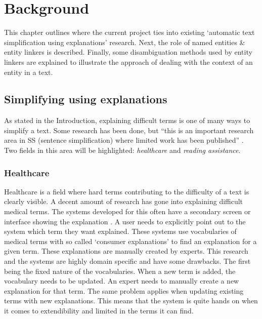 \documentclass[
10pt, %
a4paper, %
oneside, %
headinclude,footinclude, %
] {book}%
\begin{document}
\chapter{Background}

This chapter outlines where the current project ties into existing `automatic text simplification using explanations' research.
Next, the role of named entities \& entity linkers is described.
Finally, some disambiguation methods used by entity linkers are explained to illustrate the approach of dealing with the context of an entity in a text.

\section{Simplifying using explanations}
As stated in the Introduction, explaining difficult terms is one of many ways to simplify a text.
Some research has been done, but ``this is an important research area in SS (sentence simplification) where limited work has been published'' \citep{alva2020}.
Two fields in this area will be highlighted: \textit{healthcare} and \textit{reading assistance}.

\subsection{Healthcare}
Healthcare is a field where hard terms contributing to the difficulty of a text is clearly visible.
A decent amount of research has gone into explaining difficult medical terms.
The systems developed for this often have a secondary screen or interface showing the explanation \citep{alfano2020,alsheref2020,qenam2017}.
A user needs to explicitly point out to the system which term they want explained.
These systems use vocabularies of medical terms with so called `consumer explanations' to find an explanation for a given term.
These explanations are manually created by experts.
This research and the systems are highly domain specific and have some drawbacks.
The first being the fixed nature of the vocabularies.
When a new term is added, the vocabulary needs to be updated.
An expert needs to manually create a new explanation for that term.
The same problem applies when updating existing terms with new explanations.
This means that the system is quite hands on when it comes to extendibility and limited in the terms it can find.
\end{document}
